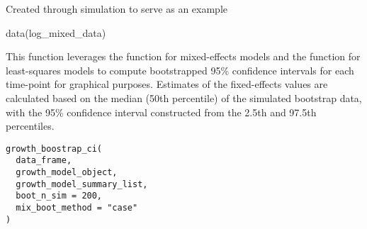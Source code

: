 \documentclass[a4paper]{book}
\begin{document}
%
\begin{Source}
Created through simulation to serve as an example
\end{Source}
%
\begin{Examples}
\begin{ExampleCode}
data(log_mixed_data)
\end{ExampleCode}
\end{Examples}
%
\begin{Description}
This function leverages the  function
for mixed-effects models and the  function
for least-squares models to compute bootstrapped 95\% confidence intervals for
each time-point for graphical purposes. Estimates of the fixed-effects
values are calculated based on the median (50th percentile) of the
simulated bootstrap data, with the 95\% confidence interval constructed
from the 2.5th and 97.5th percentiles.
\end{Description}
%
\begin{Usage}
\begin{verbatim}
growth_boostrap_ci(
  data_frame,
  growth_model_object,
  growth_model_summary_list,
  boot_n_sim = 200,
  mix_boot_method = "case"
)
\end{verbatim}
\end{Usage}
%
\end{document}
